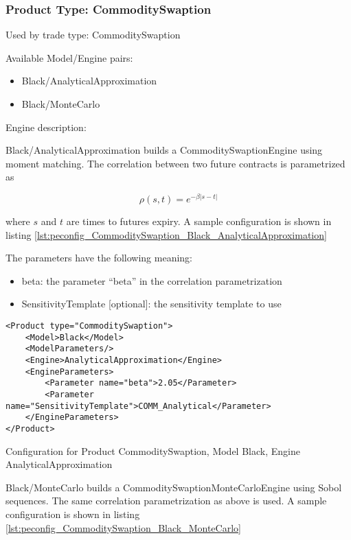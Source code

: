 \subsubsection{Product Type: CommoditySwaption}

Used by trade type: CommoditySwaption

Available Model/Engine pairs:

\begin{itemize}
\item Black/AnalyticalApproximation
\item Black/MonteCarlo
\end{itemize}

Engine description:

Black/AnalyticalApproximation builds a CommoditySwaptionEngine using moment matching. The correlation between two future
contracts is parametrized as

$$\rho(s, t) = e^{-\beta |s-t|}$$

where $s$ and $t$ are times to futures expiry. A sample configuration is shown in listing
\ref{lst:peconfig_CommoditySwaption_Black_AnalyticalApproximation}

The parameters have the following meaning:

\begin{itemize}
\item beta: the parameter ``beta'' in the correlation parametrization
\item SensitivityTemplate [optional]: the sensitivity template to use 
\end{itemize}

\begin{longlisting}
\begin{verbatim}
<Product type="CommoditySwaption">
    <Model>Black</Model>
    <ModelParameters/>
    <Engine>AnalyticalApproximation</Engine>
    <EngineParameters>
        <Parameter name="beta">2.05</Parameter>
        <Parameter name="SensitivityTemplate">COMM_Analytical</Parameter>
    </EngineParameters>
</Product>
\end{verbatim}
\caption{Configuration for Product CommoditySwaption, Model Black, Engine AnalyticalApproximation}
\label{lst:peconfig_CommoditySwaption_Black_AnalyticalApproximation}
\end{longlisting}

Black/MonteCarlo builds a CommoditySwaptionMonteCarloEngine using Sobol sequences. The same correlation parametrization
as above is used. A sample configuration is shown in listing
\ref{lst:peconfig_CommoditySwaption_Black_MonteCarlo}

